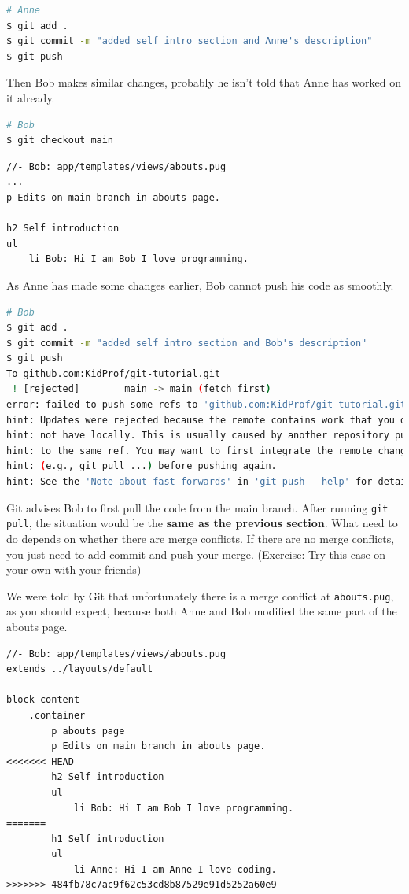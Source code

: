 \begin{lstlisting}[language=bash]
# Anne
$ git add .
$ git commit -m "added self intro section and Anne's description"
$ git push
\end{lstlisting}

Then Bob makes similar changes, probably he isn't told that Anne has worked on it already.

\begin{lstlisting}[language=bash]
# Bob
$ git checkout main
\end{lstlisting}

\begin{lstlisting}[language=pug]
//- Bob: app/templates/views/abouts.pug
...
p Edits on main branch in abouts page.

h2 Self introduction
ul
	li Bob: Hi I am Bob I love programming.
\end{lstlisting}

As Anne has made some changes earlier, Bob cannot push his code as smoothly.

\begin{lstlisting}[language=bash]
# Bob
$ git add .
$ git commit -m "added self intro section and Bob's description"
$ git push
To github.com:KidProf/git-tutorial.git
 ! [rejected]        main -> main (fetch first)
error: failed to push some refs to 'github.com:KidProf/git-tutorial.git'
hint: Updates were rejected because the remote contains work that you do
hint: not have locally. This is usually caused by another repository pushing
hint: to the same ref. You may want to first integrate the remote changes
hint: (e.g., git pull ...) before pushing again.
hint: See the 'Note about fast-forwards' in 'git push --help' for detail
\end{lstlisting}

Git advises Bob to first pull the code from the main branch. After running \texttt{git pull}, the situation would be the \textbf{same as the previous section}. What need to do depends on whether there are merge conflicts. If there are no merge conflicts, you just need to add commit and push your merge. (Exercise: Try this case on your own with your friends)
\vspace{6mm}

We were told by Git that unfortunately there is a merge conflict at \texttt{abouts.pug}, as you should expect, because both Anne and Bob modified the same part of the abouts page.

\begin{lstlisting}[language=pug]
//- Bob: app/templates/views/abouts.pug
extends ../layouts/default

block content
	.container
		p abouts page
		p Edits on main branch in abouts page.
<<<<<<< HEAD
		h2 Self introduction
		ul
			li Bob: Hi I am Bob I love programming.
=======
		h1 Self introduction
		ul
			li Anne: Hi I am Anne I love coding.
>>>>>>> 484fb78c7ac9f62c53cd8b87529e91d5252a60e9
\end{lstlisting}

